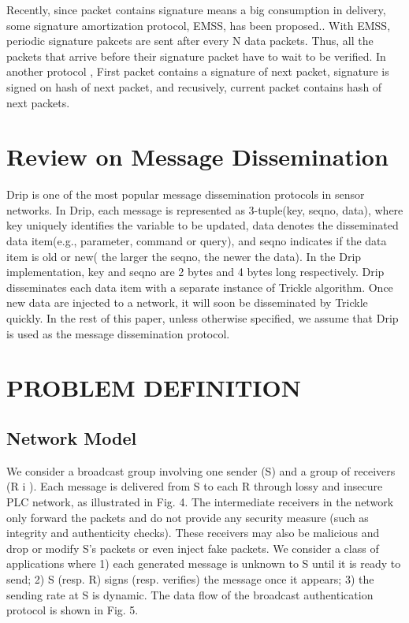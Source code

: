 \documentclass[lnicst,sechang,a4paper]{svmultln}
\begin{document}
Recently, since packet contains signature  means a big consumption in delivery, some signature amortization protocol, EMSS, has been proposed.. With EMSS\cite{efficient}, periodic signature pakcets are sent after every N data packets. Thus, all the packets that arrive before their signature packet have to wait to be verified.
In another protocol \cite{aspect} , First packet contains a signature of next packet, signature is signed on hash of next packet, and recusively, current packet contains hash of next packets. 

\section{Review on Message Dissemination}
Drip is one of the most popular message dissemination protocols in sensor networks. In Drip, each message is represented as 3-tuple(key, seqno, data), where key uniquely identifies the variable to be updated, data denotes the disseminated data item(e.g., parameter, command or query), and seqno indicates if the data item is old or new( the larger the seqno, the newer the data). In the Drip implementation, key and seqno are 2 bytes and 4 bytes long respectively.
Drip disseminates each data item with a separate instance of Trickle algorithm.
Once new data are injected to a network, it will soon be disseminated by Trickle quickly\cite{trickle}.
In the rest of this paper, unless otherwise specified, we assume that Drip is used as the message dissemination protocol.
\section{PROBLEM DEFINITION}
\subsection{Network Model}
We consider a broadcast group involving one sender (S) and
a group of receivers (R i ). Each message is delivered from S to
each R through lossy and insecure PLC network, as illustrated
in Fig. 4. The intermediate receivers in the network only
forward the packets and do not provide any security measure
(such as integrity and authenticity checks). These receivers
may also be malicious and drop or modify S’s packets or
even inject fake packets.
We consider a class of applications where 1) each generated
message is unknown to S until it is ready to send; 2) S
(resp. R) signs (resp. verifies) the message once it appears;
3) the sending rate at S is dynamic. The data flow of the
broadcast authentication protocol is shown in Fig. 5.
\end{document}
